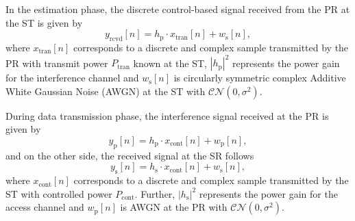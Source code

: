 \documentclass[12pt, draftclsnofoot, onecolumn]{IEEEtran}
\newcommand{\e}[2]{{\mathbb E}_{#1}\left[ #2 \right]}
\newcommand{\s}[2]{{\frac{1}{{#1}}\sum_n^{#1}} {#2}}
\newcommand{\sub}[1]{_{\text{#1}}}
\newcommand{\preg}{P\sub{cont}}
\newcommand{\xreg}{x\sub{cont}}
\newcommand{\prcvd}{P\sub{rcvd}}
\newcommand{\yrcvd}{y\sub{rcvd}}
\newcommand{\ptran}{P\sub{tran}}
\newcommand{\xtran}{x\sub{tran}}
\newcommand{\pp}{P\sub{p}}
\newcommand{\ps}{P\sub{s}}
\newcommand{\yp}{y\sub{p}}
\newcommand{\ys}{y\sub{s}}
\newcommand{\nap}{w\sub{p}}
\newcommand{\nas}{w\sub{s}}
\newcommand{\gp}{h\sub{p}}
\newcommand{\gs}{h\sub{s}}
\newcommand{\pgp}{|h\sub{p}|^2}
\newcommand{\pgs}{|h\sub{s}|^2}
\newcommand{\npp}{\sigma^2\sub{p}}
\newcommand{\nps}{\sigma^2}
\newcommand{\fsam}{f\sub{s}}
\begin{document}
In the estimation phase, the discrete control-based signal received from the PR at the ST is given by \cite{Kaushik15}
\begin{equation}
\yrcvd[n] = \gp \cdot \xtran[n] + \nas[n],
\label{eq:sys_mod_st}
\end{equation}
where $\xtran[n]$ corresponds to a discrete and complex sample transmitted by the PR with transmit power $\ptran$ known at the ST, $\pgp$ represents the power gain for the interference channel and $\nas[n]$ is circularly symmetric complex Additive White Gaussian Noise (AWGN) at the ST with %
$\mathcal{CN}(0, \nps)$. %

During data transmission phase, the interference signal received at the PR is given by
\begin{equation}
\yp[n] = \gp  \cdot \xreg[n] + \nap[n],
\label{eq:sys_mod_pr}
\end{equation}
and on the other side, the received signal at the SR follows 
\begin{equation}
\ys[n] = \gs \cdot \xreg[n] + \nas[n],
\label{eq:sys_mod_sr}
\end{equation}
where $\xreg[n]$ corresponds to a discrete and complex sample transmitted by the ST with controlled power $\preg$. Further, $\pgs$ represents the power gain for the access channel and $\nap[n]$ is AWGN at the PR with $\mathcal{CN}(0, \nps)$. %
\end{document}

